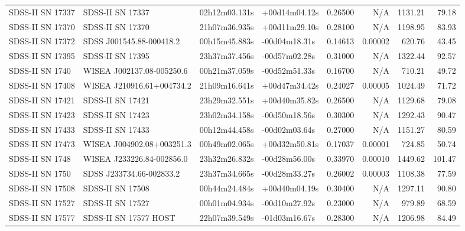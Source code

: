 \begin{longtable}{llllrrrr}
SDSS-II SN 17337 &                SDSS-II SN 17337 &   02h12m03.131s &   +00d14m04.12s &  0.26500 &      N/A &  1131.21 &       79.18 \\
SDSS-II SN 17370 &                SDSS-II SN 17370 &   21h07m36.935s &   +00d11m29.10s &  0.28100 &      N/A &  1198.95 &       83.93 \\
SDSS-II SN 17372 &        SDSS J001545.88-000418.2 &   00h15m45.883s &   -00d04m18.31s &  0.14613 &  0.00002 &   620.76 &       43.45 \\
SDSS-II SN 17395 &                SDSS-II SN 17395 &   23h37m37.456s &   -00d57m02.28s &  0.31000 &      N/A &  1322.44 &       92.57 \\
SDSS-II SN 1740  &       WISEA J002137.08-005250.6 &   00h21m37.059s &   -00d52m51.33s &  0.16700 &      N/A &   710.21 &       49.72 \\
SDSS-II SN 17408 &       WISEA J210916.61+004734.2 &   21h09m16.641s &   +00d47m34.42s &  0.24027 &  0.00005 &  1024.49 &       71.72 \\
SDSS-II SN 17421 &                SDSS-II SN 17421 &   23h29m32.551s &   +00d40m35.82s &  0.26500 &      N/A &  1129.68 &       79.08 \\
SDSS-II SN 17423 &                SDSS-II SN 17423 &   23h02m34.158s &   -00d50m18.56s &  0.30300 &      N/A &  1292.43 &       90.47 \\
SDSS-II SN 17433 &                SDSS-II SN 17433 &   00h12m44.458s &   -00d02m03.64s &  0.27000 &      N/A &  1151.27 &       80.59 \\
SDSS-II SN 17473 &       WISEA J004902.08+003251.3 &   00h49m02.065s &   +00d32m50.81s &  0.17037 &  0.00001 &   724.85 &       50.74 \\
SDSS-II SN 1748  &       WISEA J233226.84-002856.0 &   23h32m26.832s &   -00d28m56.00s &  0.33970 &  0.00010 &  1449.62 &      101.47 \\
SDSS-II SN 1750  &        SDSS J233734.66-002833.2 &   23h37m34.665s &   -00d28m33.27s &  0.26002 &  0.00003 &  1108.38 &       77.59 \\
SDSS-II SN 17508 &                SDSS-II SN 17508 &   00h44m24.484s &   +00d40m04.19s &  0.30400 &      N/A &  1297.11 &       90.80 \\
SDSS-II SN 17527 &                SDSS-II SN 17527 &   00h01m04.934s &   -00d10m27.92s &  0.23000 &      N/A &   979.89 &       68.59 \\
SDSS-II SN 17577 &           SDSS-II SN 17577 HOST &   22h07m39.549s &   -01d03m16.67s &  0.28300 &      N/A &  1206.98 &       84.49 \\

\end{longtable}
